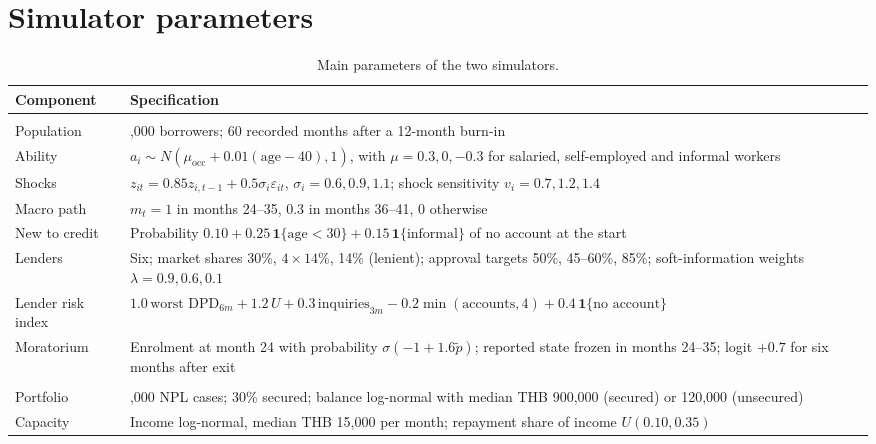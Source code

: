 \documentclass[10pt]{article}
\newcommand{\ind}{\mathbf{1}}
\begin{document}

{\small}


\appendix
\section{Simulator parameters}\label{app:params}

\begin{table}[H]
\centering\small
\caption{Main parameters of the two simulators.}
\label{tab:params}
\begin{tabularx}{\textwidth}{>{\raggedright\arraybackslash}p{3.4cm} >{\raggedright\arraybackslash}X}
\toprule
Component & Specification \\
\midrule
\multicolumn{2}{l}{\emph{Bureau simulator}} \\
Population & 50,000 borrowers; 60 recorded months after a 12-month burn-in \\
Ability & $a_i \sim N(\mu_{\text{occ}} + 0.01(\text{age}-40), 1)$, with $\mu = 0.3, 0, -0.3$ for salaried, self-employed and informal workers \\
Shocks & $z_{it} = 0.85 z_{i,t-1} + 0.5\sigma_i\varepsilon_{it}$, $\sigma_i = 0.6, 0.9, 1.1$; shock sensitivity $v_i = 0.7, 1.2, 1.4$ \\
Macro path & $m_t = 1$ in months 24--35, $0.3$ in months 36--41, $0$ otherwise \\
New to credit & Probability $0.10 + 0.25\,\ind\{\text{age}<30\} + 0.15\,\ind\{\text{informal}\}$ of no account at the start \\
Lenders & Six; market shares 30\%, $4\times 14\%$, 14\% (lenient); approval targets 50\%, 45--60\%, 85\%; soft-information weights $\lambda = 0.9, 0.6, 0.1$ \\
Lender risk index & $1.0\,\text{worst DPD}_{6m} + 1.2\,U + 0.3\,\text{inquiries}_{3m} - 0.2\min(\text{accounts},4) + 0.4\,\ind\{\text{no account}\}$ \\
Moratorium & Enrolment at month 24 with probability $\sigma(-1+1.6\tilde p)$; reported state frozen in months 24--35; logit $+0.7$ for six months after exit \\
\midrule
\multicolumn{2}{l}{\emph{Workout simulator}} \\
Portfolio & 50,000 NPL cases; 30\% secured; balance log-normal with median THB 900,000 (secured) or 120,000 (unsecured) \\
Capacity & Income log-normal, median THB 15,000 per month; repayment share of income $U(0.10, 0.35)$ \\

\end{tabularx}
\end{table}
\end{document}
